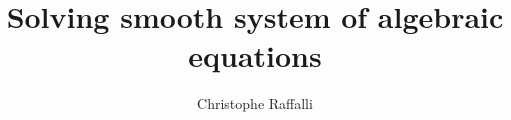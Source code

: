 \usepackage{hyperref}
\usepackage{enumerate}
\usepackage{enumitem}
\usepackage{amssymb,amsmath,amsthm} %
\usepackage[mathletters]{ucs}
\usepackage{tikz}
\usepackage[utf8x]{inputenc}
\usepackage{graphicx}
\usepackage{stmaryrd}
\usepackage[autosize]{dot2texi}
\usepackage{multicol}
\setlength{\multicolsep}{0pt}
\usepackage{tikz}
\usetikzlibrary{shapes,arrows,tikzmark,decorations.pathreplacing,calc}
\usepackage{adjustbox}

\title{Solving smooth system of algebraic equations}
\author{Christophe Raffalli}

\newcommand{\interior}[1]{%
  #1^{\mathrm{o}}%
}
\newcommand{\cardinal}[1]{%
  \#({#1})%
}
\newcommand{\hull}[1]{%
  \mathcal H({#1})%
}
\newcommand{\cone}[1]{%
  \mathcal C({#1})%
}
\newcommand{\vertices}[1]{%
  \mathcal V({#1})%
}
\newcommand{\ball}[2]{%
  \mathcal B_{#2}({#1})%
}
\newcommand{\cball}[2]{%
  \mathcal Bᶜ_{#2}({#1})%
}

\newcommand{\PNR}{{\cal P}^n(ℝ)}
\newcommand{\SNR}{{\cal S}^n(ℝ)}

\newtheorem{theo}{Theorem}
\newtheorem{nota}[theo]{Notation}
\newtheorem{defi}[theo]{Definition}
\newtheorem{prop}[theo]{Proposition}
\newtheorem{exam}[theo]{Example}

